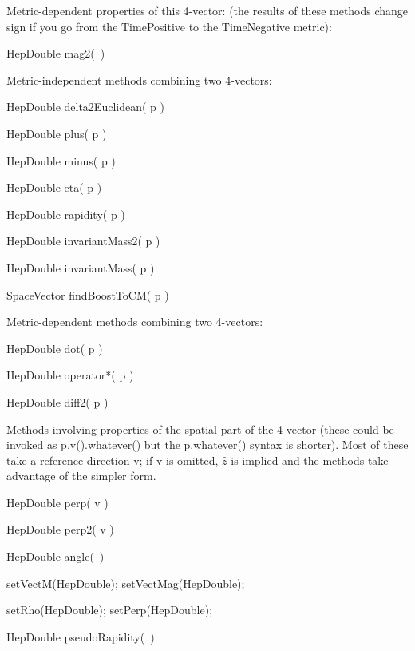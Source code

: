 \noindent
Metric-dependent properties of this 4-vector:
(the results of these methods change sign if you go from the
TimePositive to the TimeNegative metric):
\begin{shortlist}
  \item HepDouble mag2(~) \see{\ref{eq:wmag2}}
\end{shortlist}

\noindent
Metric-independent methods combining two 4-vectors:
\begin{shortlist}
  \item HepDouble delta2Euclidean( p ) \see{\ref{eq:wdelta2E}}
  \item HepDouble plus( p ) \see{\ref{eq:wplus:2}}
  \item HepDouble minus( p ) \see{\ref{eq:wminus:2}}
  \item HepDouble eta( p ) \see{\ref{eq:weta}, \ref{eq:weta:2}, \ref{eq:weta:3}, \ref{eq:weta:4}}
  \item HepDouble rapidity( p ) \see{\ref{eq:wrapid}, \ref{eq:wrapid:2}, \ref{eq:wrapid:3}, \ref{eq:wrapid:4}}  
  \item HepDouble invariantMass2( p ) \see{\ref{eq:winvMass2}}
  \item HepDouble invariantMass( p ) \see{\ref{eq:winvMass}}
  \item SpaceVector findBoostToCM( p ) \see{\ref{eq:wfindBoost}}
\end{shortlist}

\noindent
Metric-dependent methods combining two 4-vectors:
\begin{shortlist}
  \item HepDouble dot( p ) \see{\ref{eq:wdot}, \ref{eq:wdot:2}}
  \item HepDouble operator*( p ) \see{\ref{eq:wdot}, \ref{eq:wdot:2}}
  \item HepDouble diff2( p ) \see{\ref{eq:wdiff2}}
\end{shortlist}


\noindent 
Methods involving properties of the spatial part of the 4-vector
(these could be invoked as p.v().whatever() but the p.whatever()
syntax is shorter).  
Most of these take a reference direction v; if v is omitted,
$\hat{z}$ is implied and the methods take advantage of the simpler form.
\begin{shortlist}
  \item HepDouble perp( v ) \see{\ref{eq:perp}}
  \item HepDouble perp2( v ) \see{\ref{eq:perp2}}
  \item HepDouble angle(~) \see{\ref{eq:angle}}
  \item setVectM(HepDouble); \/\/\/  setVectMag(HepDouble); 
						\see{\ref{eq:polar}}
  \item setRho(HepDouble); \/\/\/  setPerp(HepDouble); 
						\see{\ref{eq:cylindrical}}
  \item HepDouble pseudoRapidity(~) \see{\ref{eq:spherical}}
\end{shortlist}



